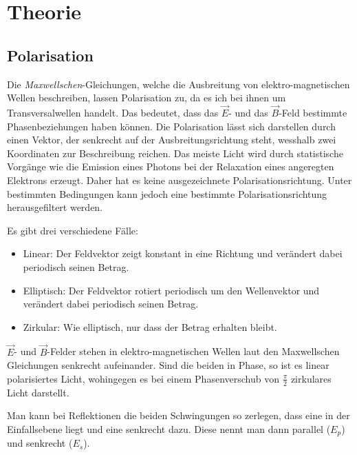 \documentclass[12pt,a4paper,titlepage,headinclude,bibtotoc]{scrartcl}
\begin{document}
\section{Theorie}
\label{sec:theorie}
\subsection{Polarisation}
Die \textit{Maxwellschen}-Gleichungen, welche die Ausbreitung von elektro-magnetischen Wellen beschreiben, lassen Polarisation zu, da es ich bei ihnen um Transversalwellen handelt.
Das bedeutet, dass das $\vec E$- und das $\vec B$-Feld bestimmte Phasenbeziehungen haben können.
Die Polarisation lässt sich darstellen durch einen Vektor, der senkrecht auf der Ausbreitungsrichtung steht, wesshalb zwei Koordinaten zur Beschreibung reichen.
Das meiste Licht wird durch statistische Vorgänge wie die Emission eines Photons bei der Relaxation eines angeregten Elektrons erzeugt.
Daher hat es keine ausgezeichnete Polarisationsrichtung.
Unter bestimmten Bedingungen kann jedoch eine bestimmte Polarisationsrichtung herausgefiltert werden.

Es gibt drei verschiedene Fälle:
\begin{itemize}
	\item Linear: Der Feldvektor zeigt konstant in eine Richtung und verändert dabei periodisch seinen Betrag.
	\item Elliptisch: Der Feldvektor rotiert periodisch um den Wellenvektor und verändert dabei periodisch seinen Betrag.
	\item Zirkular: Wie elliptisch, nur dass der Betrag erhalten bleibt.
\end{itemize}

$\vec E$- und $\vec B$-Felder stehen in elektro-magnetischen Wellen laut den Maxwellschen Gleichungen senkrecht aufeinander.
Sind die beiden in Phase, so ist es linear polarisiertes Licht, wohingegen es bei einem Phasenverschub von $\frac{\pi}{2}$ zirkulares Licht darstellt.

Man kann bei Reflektionen die beiden Schwingungen so zerlegen, dass eine in der Einfallsebene liegt und eine senkrecht dazu.
Diese nennt man dann parallel ($E_p$) und senkrecht ($E_s$).
\end{document}
